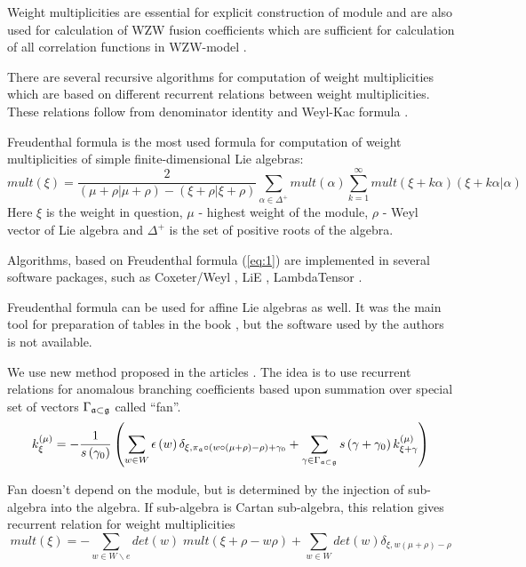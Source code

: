 \documentclass[a4paper,12pt]{article}
\theoremstyle{definition} \newtheorem{Def}{Definition}
\begin{document}
Weight multiplicities are essential for explicit construction of
module and are also used for calculation of WZW fusion coefficients
which are sufficient for calculation of all correlation functions in
WZW-model \cite{Walton:1999xc}.

There are several recursive algorithms for computation of weight
multiplicities which are based on different recurrent relations
between weight multiplicities. These relations follow from denominator
identity and Weyl-Kac formula \cite{kac1990idl,wakimoto2001idl}. 

Freudenthal formula is the most used formula for computation of weight
multiplicities of simple finite-dimensional Lie algebras:
\begin{equation}
  \label{eq:1}
   mult(\xi)=\frac{2}{(\mu+\rho|\mu+\rho)-(\xi+\rho|\xi+\rho)}\sum_{\alpha\in\Delta^{+}} mult(\alpha) \sum_{k=1}^{\infty}mult(\xi+k\alpha)(\xi+k\alpha|\alpha)
\end{equation}
Here $\xi$ is the weight in question, $\mu$ - highest weight of the
module, $\rho$ - Weyl vector of Lie algebra and $\Delta^{+}$ is the
set of positive roots of the algebra.

Algorithms, based on Freudenthal formula (\ref{eq:1}) are implemented
in several software packages, such as Coxeter/Weyl
\cite{stembridge1995mps}, LiE \cite{vanleeuwen1994lsp}, LambdaTensor
\cite{fischbacher2002ilp}.

Freudenthal formula can be used for affine Lie algebras as well. It was
the main tool for preparation of tables in the book
\cite{kass1990ala}, but the software used by the authors is not
available. 

We use new method proposed in the articles
\cite{lyakhovsky1996rra,lyakhovsky2007dub,ilyin812pbc,kulish4sfa}. The
idea is to use recurrent relations for anomalous branching
coefficients based upon summation over special
set of vectors $\Gamma_{\frak{a}\subset \frak{g}} $ called ``fan''.
\begin{equation}
  \label{recurrent-relation}
  k_{\xi }^{\left( \mu \right) }=-\frac{1}{s\left( \gamma _{0}\right) }\left(
    \sum_{w\in W}\epsilon \left( w\right) \delta _{\xi ,\pi _{\frak{a}}\circ
      \left( w\circ (\mu +\rho )-\rho \right) +\gamma _{0}}+\sum_{\gamma \in
      \Gamma _{\frak{a}\subset \frak{g}}}s\left( \gamma +\gamma _{0}\right) k_{\xi
      +\gamma }^{\left( \mu \right) }\right)   
\end{equation}

Fan doesn't depend on the module, but
is determined by the injection of sub-algebra into the algebra. If 
sub-algebra is Cartan sub-algebra, this relation gives recurrent
relation for weight multiplicities
\begin{equation}
  \label{eq:2}
  mult(\xi)=-\sum_{w\in W\backslash e}det(w)\;mult(\xi+\rho-w\rho)+\sum_{w\in W}det(w)\delta_{\xi,w(\mu+\rho)-\rho}
\end{equation}
\end{document}
